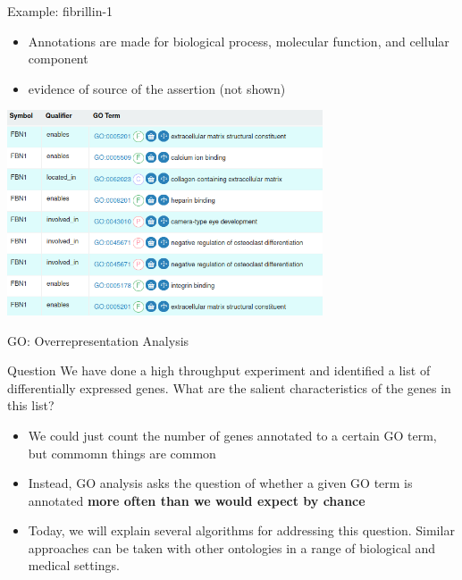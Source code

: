 \documentclass{beamer}
\begin{document}
\begin{frame}{Example: fibrillin-1}
\begin{itemize}
\item Annotations are made for biological process, molecular function, and cellular component
\item evidence of source of the assertion (not shown)
\end{itemize} 

\begin{center}
\includegraphics[width=0.7\textwidth]{img/fbn1-goa.png}
\end{center}
\end{frame}


\begin{frame}{GO: Overrepresentation Analysis}
\begin{mybluebox}{Question}
We have done a high throughput experiment and identified a list of differentially 
expressed genes. What are the salient characteristics of the genes in this list?
\end{mybluebox}

 \begin{itemize}
  \item We could just count the number of genes annotated to a certain GO term, but commomn things are common
  \item Instead, GO analysis asks the question of whether a given GO term is annotated {\bf more often than we would expect by chance}
\item Today, we will explain several algorithms for addressing this question. Similar approaches can be taken with other ontologies in a range of biological and medical settings.
 \end{itemize}

\end{frame}
\end{document}
